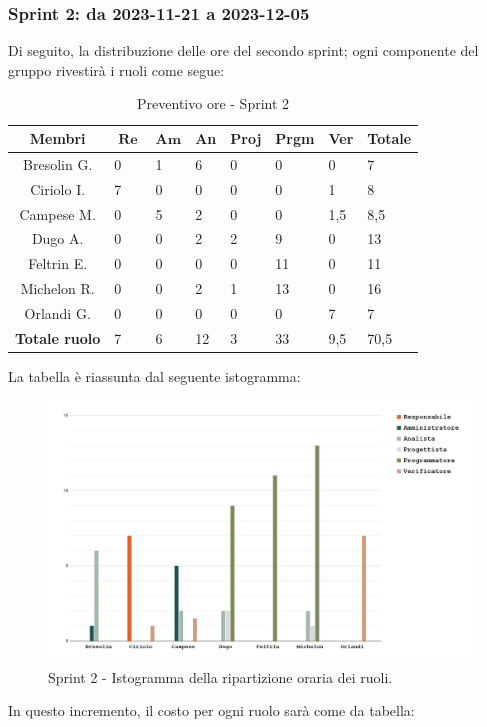 \documentclass[10pt, a4paper]{article}
\begin{document}
{{{{{{{{{\subsubsection{Sprint 2: da 2023-11-21 a 2023-12-05 }
Di seguito, la distribuzione delle ore del secondo sprint; ogni componente del gruppo rivestirà i ruoli come segue:
\begin{table}[H]
\begin{tabularx}{\textwidth}{c|X|X|X|X|X|X|X}
        \textbf{Membri} & $\operatorname{\textbf{Re}}$ & $\mathrm{\textbf{Am}}$ & \textbf{An} & \textbf{Proj} & \textbf{Prgm} & \textbf{Ver} & \textbf{Totale} \\
        \hline Bresolin G. & 0 & 1 & \cellcolor{primarycolor}6 & 0 & 0 & 0 & 7 \\
        \hline Ciriolo I.  & \cellcolor{primarycolor}7 & 0 & 0 & 0 & 0 & 1 & 8 \\
        \hline Campese M.  & 0 & \cellcolor{primarycolor}5 & 2 & 0 & 0 & 1,5 & 8,5 \\
        \hline Dugo A.     & 0 & 0 & 2 & \cellcolor{primarycolor}2 & 9 & 0 & 13 \\
        \hline Feltrin E.  & 0 & 0 & 0 & 0 & \cellcolor{primarycolor}11 & 0 & 11 \\
        \hline Michelon R. & 0 & 0 & 2 & 1 & \cellcolor{primarycolor}13 & 0 & 16 \\
        \hline Orlandi G.  & 0 & 0 & 0 & 0 & 0 & \cellcolor{primarycolor}7 & 7 \\
        \hline
        \textbf{Totale ruolo} & 7 & 6 & 12 & 3 & 33 & 9,5 & 70,5 
    \end{tabularx}
    \caption{Preventivo ore - Sprint 2}
    \end{table}
La tabella è riassunta dal seguente istogramma:
 \begin{figure}[H]
        \centering        
        \includegraphics[width=15.5cm]{istogrammi/istogramma_2_periodo.png}
        \caption{Sprint 2 - Istogramma della ripartizione oraria dei ruoli. }
    \end{figure}
In questo incremento, il costo per ogni ruolo sarà come da tabella:
{\renewcommand{\arraystretch}{1.5}
\begin{table}[H]
\centering
\begin{tabularx}{0.42\textwidth}{c|c|c}


\end{tabularx}
\end{table}}}}}}}}}}}
\end{document}

